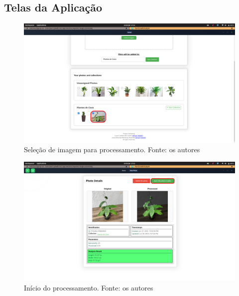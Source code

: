 \subsection{Telas da Aplicação}

\begin{figure}[H]
    \centering
    \includegraphics[width=1\textwidth]{../figures/screens/uc013/Screenshot from 2025-06-28 17-11-12.png}
    \caption{Seleção de imagem para processamento. Fonte: os autores}
    \label{fig:uc013-screen1}
\end{figure}

\begin{figure}[H]
    \centering
    \includegraphics[width=1\textwidth]{../figures/screens/uc013/Screenshot from 2025-06-28 17-11-16.png}
    \caption{Início do processamento. Fonte: os autores}
    \label{fig:uc013-screen2}
\end{figure}


